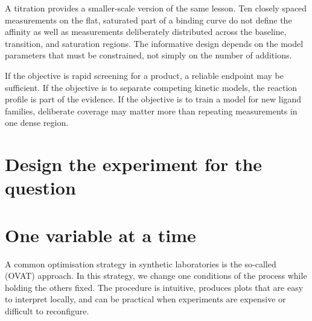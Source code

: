 A titration provides a smaller-scale version of the same lesson.
Ten closely spaced measurements on the flat, saturated part of a binding curve do not define the affinity as well as measurements deliberately distributed across the baseline, transition, and saturation regions.
The informative design depends on the model parameters that must be constrained, not simply on the number of additions.


If the objective is rapid screening for a product, a reliable endpoint may be sufficient.
If the objective is to separate competing kinetic models, the reaction profile is part of the evidence.
If the objective is to train a model for new ligand families, deliberate coverage may matter more than repeating measurements in one dense region.


\section{Design the experiment for the question}

\section{One variable at a time}

A common optimisation strategy in synthetic laboratories is the so-called  (OVAT) approach.
In this strategy, we change one conditions of the process while holding the others fixed.
The procedure is intuitive, produces plots that are easy to interpret locally, and can be practical when experiments are expensive or difficult to reconfigure.

